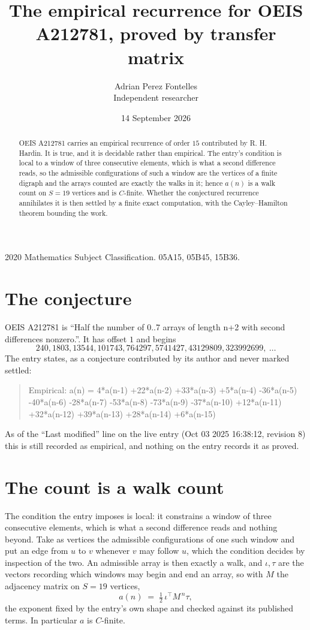 \documentclass[11pt,a4paper]{article}
\title{The empirical recurrence for OEIS A212781, proved by transfer matrix}
\author{Adrian Perez Fontelles\\ \small Independent researcher}
\date{14 September 2026}
\theoremstyle{plain}
\theoremstyle{definition}
\begin{document}
\maketitle

\begin{abstract}
OEIS A212781 carries an empirical recurrence of order $15$ contributed by R. H. Hardin. It is
true, and it is decidable rather than empirical. The entry's condition is local to a window of three consecutive elements, which is what a second difference reads, so
the admissible configurations of such a window are the vertices of a finite digraph and the
arrays counted are exactly the walks in it; hence $a(n)$ is a walk count on $S=19$ vertices
and is $C$-finite. Whether the conjectured recurrence annihilates it is then settled by a
finite exact computation, with the Cayley--Hamilton theorem bounding the work.
\end{abstract}

\noindent\small 2020 Mathematics Subject Classification. 05A15, 05B45, 15B36.\normalsize

\section{The conjecture}

OEIS A212781 is ``Half the number of 0..7 arrays of length n+2 with second differences nonzero.''. It has offset $1$ and begins
\[
240, 1803, 13544, 101743, 764297, 5741427, 43129809, 323992699,\ \dots
\]
The entry states, as a conjecture contributed by its author and never marked settled:
\begin{quote}
Empirical: a(n) = 4*a(n-1) +22*a(n-2) +33*a(n-3) +5*a(n-4) -36*a(n-5) -40*a(n-6) -28*a(n-7) -53*a(n-8) -73*a(n-9) -37*a(n-10) +12*a(n-11) +32*a(n-12) +39*a(n-13) +28*a(n-14) +6*a(n-15)
\end{quote}
As of the ``Last modified'' line on the live entry (Oct 03 2025 16:38:12, revision 8) this is still
recorded as empirical, and nothing on the entry records it as proved.

\section{The count is a walk count}

The condition the entry imposes is local: it constrains a window of three consecutive elements, which is what a second difference reads and nothing beyond. Take as vertices the admissible configurations of one such window and put an edge from $u$ to $v$ whenever $v$ may follow $u$, which the condition decides by inspection of the two.
An admissible array is then exactly a walk, and $\iota,\tau$ are the vectors recording which windows may begin and end an array, so with $M$ the adjacency matrix on $S=19$ vertices,
\[
a(n)\;=\;\tfrac{1}{2}\,\iota^{\!\top}M^{\,n}\tau ,
\]
the exponent fixed by the entry's own shape and checked against its published terms. In
particular $a$ is $C$-finite.
\end{document}
